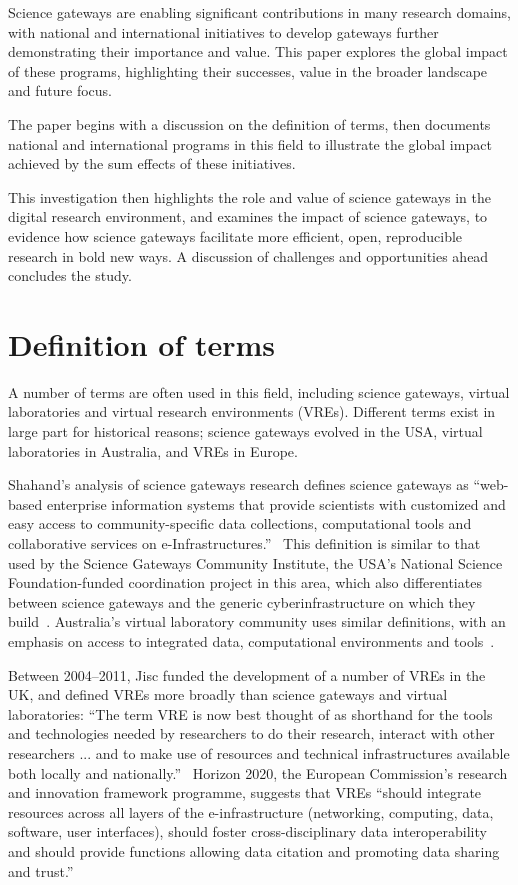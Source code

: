\documentclass[review]{elsarticle}
\newcommand{\changedtext}[1]{
	{#1}
}
\begin{document}
Science gateways are enabling significant contributions in many research domains, with national and international initiatives to develop gateways further demonstrating their importance and value. 
This paper explores the global impact of these programs, highlighting their successes, value in the broader landscape and future focus. 
\changedtext{The paper begins with a discussion on the definition of terms, then documents national and international programs in this field to illustrate the global impact achieved by  the sum effects of these  initiatives.}
This investigation then highlights the role and value of science gateways in the digital research environment, and examines the impact of science gateways, to evidence how science gateways facilitate more efficient, open, reproducible research in bold new ways. 
A discussion of challenges and opportunities ahead concludes the study. 

\section{Definition of terms}

A number of terms are often used in this field, including science gateways, virtual laboratories and virtual research environments (VREs). Different terms exist in large part for historical reasons; science gateways evolved in the USA, virtual laboratories in Australia, and VREs in Europe. 

Shahand's analysis of science gateways research defines science gateways as ``web-based enterprise information systems that provide scientists with customized and easy access to community-specific data collections, computational tools and collaborative services on e-Infrastructures.''~\cite{shahand2015-1} This definition is similar to that used by the Science Gateways Community Institute, the USA's National Science Foundation-funded coordination project in this area, which also differentiates between science gateways and the generic cyberinfrastructure on which they build~\cite{what-is-sg-2}. Australia's virtual laboratory community uses similar definitions, with an emphasis on access to integrated data, computational environments and tools~\cite{nectar-impact-3}. 

Between 2004--2011, Jisc funded the development of a number of VREs in the UK, and defined VREs more broadly than science gateways and virtual laboratories: ``The term VRE is now best thought of as shorthand for the tools and technologies needed by researchers to do their research, interact with other researchers ... and to make use of resources and technical infrastructures available both locally and nationally.''~\cite{jisc-vre-4} Horizon 2020, the European Commission's research and innovation framework programme, suggests that VREs ``should integrate resources across all layers of the e-infrastructure (networking, computing, data, software, user interfaces), should foster cross-disciplinary data interoperability and should provide functions allowing data citation and promoting data sharing and trust.''~\cite{h2020-vre-5} 
\end{document}
